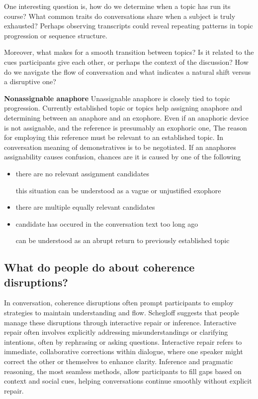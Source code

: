 \documentclass[12pt]{report}
\begin{document}
{\par
    One interesting question is,
    how do we determine when a topic has run its course?
    What common traits do conversations share when a subject is truly exhausted?
    Perhaps observing transcripts could reveal repeating patterns in topic progression or sequence structure.

\par
    Moreover, what makes for a smooth transition between topics?
    Is it related to the cues participants give each other,
    or perhaps the context of the discussion?
    How do we navigate the flow of conversation and
    what indicates a natural shift versus a disruptive one?

\par
\textbf{Nonassignable anaphore}
    Unassignable anaphore is closely tied to topic progression.
    Currently established topic or topics help assigning anaphore and
    determining	between an anaphore and an exophore.
    Even if an anaphoric device is not assignable,
    and the reference is presumably an exophoric one,
    The reason for employing this reference must be
    relevant to an established topic.
    In conversation meaning of demonstratives is to be negotiated.
    If an anaphores assignability causes confusion,
	chances are it is caused by one of the following

\begin{itemize}
\item
there are no relevant assignment candidates

    \quad
    this situation can be understood as a vague or unjustified exophore

\item
there are multiple equally relevant candidates

\item
candidate has occured in the conversation text too long ago

    \quad
    can be understood as an abrupt return to previously established topic
\end{itemize}

\subsection{What do people do about coherence disruptions?}
\par
In conversation, coherence disruptions often prompt participants to
employ strategies to maintain understanding and flow.
Schegloff suggests that people manage these disruptions through interactive repair or inference.
Interactive repair often involves
explicitly addressing misunderstandings or clarifying intentions,
often by rephrasing or asking questions.
Interactive repair refers to immediate, collaborative corrections within dialogue,
where one speaker might correct the other or themselves to enhance clarity.
Inference and pragmatic reasoning, the most seamless methods,
allow participants to fill gaps based on context and social cues,
helping conversations continue smoothly without explicit repair.

}
\end{document}

